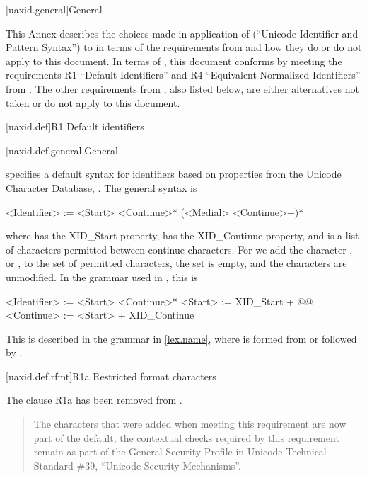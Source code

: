 
[uaxid.general]{General}

\pnum
This Annex describes the choices made in application of
 (``Unicode Identifier and Pattern Syntax'')
to \Cpp{} in terms of the requirements from  and
how they do or do not apply to this document.
In terms of ,
this document conforms by meeting the requirements
R1 ``Default Identifiers'' and
R4 ``Equivalent Normalized Identifiers'' from .
The other requirements from , also listed below,
are either alternatives not taken or do not apply to this document.

[uaxid.def]{R1 Default identifiers}

[uaxid.def.general]{General}
%
%

\pnum
{} specifies a default syntax for identifiers
based on properties from the Unicode Character Database, .
The general syntax is
\begin{outputblock}
<Identifier> := <Start> <Continue>* (<Medial> <Continue>+)*
\end{outputblock}
where  has the XID_Start property,
 has the XID_Continue property, and
 is a list of characters permitted between continue characters.
For \Cpp{} we add the character , or \tcode{_},
to the set of permitted  characters,
the  set is empty, and
the  characters are unmodified.
In the grammar used in , this is
\begin{outputblock}
<Identifier> := <Start> <Continue>*
<Start> := XID_Start + @\textrm{}@
<Continue> := <Start> + XID_Continue
\end{outputblock}

\pnum
This is described in the \Cpp{} grammar in \ref{lex.name},
where  is formed from
 or
 followed by .

[uaxid.def.rfmt]{R1a Restricted format characters}

\pnum
The clause R1a has been removed from .
\begin{quote}
The characters that were added when meeting this requirement are now part of the default; the contextual checks required by this requirement remain as part of the General Security Profile in Unicode Technical Standard \#39, “Unicode Security Mechanisms”.
\end{quote}

